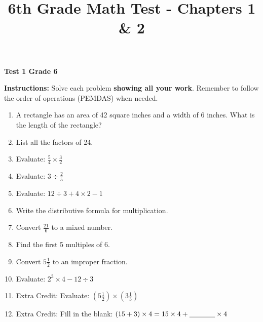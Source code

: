 \documentclass[11pt]{article}
\title{6th Grade Math Test - Chapters 1 \& 2}
\date{}
\newcommand{\thespacey}{\vspace{0.2in}}
\begin{document}
{\Large \textbf{Test 1 Grade 6}}
\vspace{0.2in}


\textbf{Instructions:} Solve each problem \textbf{showing all your work}. Remember to follow the order of operations (PEMDAS) when needed.

\vspace{0.3in}

\begin{enumerate}
    \item A rectangle has an area of 42 square inches and a width of 6 inches. What is the length of the rectangle?
    
    \thespacey
    
    \item List all the factors of 24.
    
    \thespacey
    
    \item Evaluate: $\frac{5}{4} \times \frac{3}{2}$
    
    \thespacey
    
    \item Evaluate: $3 \div \frac{2}{5}$
    
    \thespacey
    
    \item Evaluate: $12 \div 3 + 4 \times 2 - 1$
    
    \thespacey

    \item Write the distributive formula for multiplication.
    
    \thespacey
    

    \item Convert $\frac{21}{6}$ to a mixed number.
    
    \thespacey
    
    \item Find the first 5 multiples of 6.
    
    \thespacey

    \item Convert $5 \frac{1}{2}$ to an improper fraction.
    
    \thespacey
    
    \item Evaluate: $2^3 \times 4 - 12 \div 3$
    
    \thespacey
    
    \item Extra Credit: Evaluate: $\left( 5 \frac{1}{2} \right) \times \left( 3 \frac{1}{3} \right)$
    
    \thespacey

    \item Extra Credit: Fill in the blank: $(15 + 3) \times 4 = 15 \times 4 + \underline{\hspace{0.5in}} \times 4$
\end{enumerate}
\end{document}
